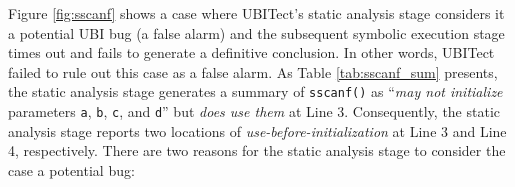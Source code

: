 

Figure \ref{fig:sscanf} shows a case where UBITect's static analysis stage considers it a potential UBI bug (a false alarm) and the subsequent symbolic execution stage times out and fails to generate a definitive conclusion. In other words, UBITect failed to rule out this case as a false alarm. 
As Table \ref{tab:sscanf_sum} presents, the static analysis stage generates a summary of \texttt{sscanf()} as ``\textit{may not initialize}
parameters \texttt{a}, \texttt{b}, \texttt{c}, and \texttt{d}'' but \textit{does use them} at Line 3.
Consequently, the static analysis stage reports two locations of \textit{use-before-initialization} at Line 3 and Line 4, respectively.
There are two reasons for the static analysis stage to consider the case a potential bug: 
